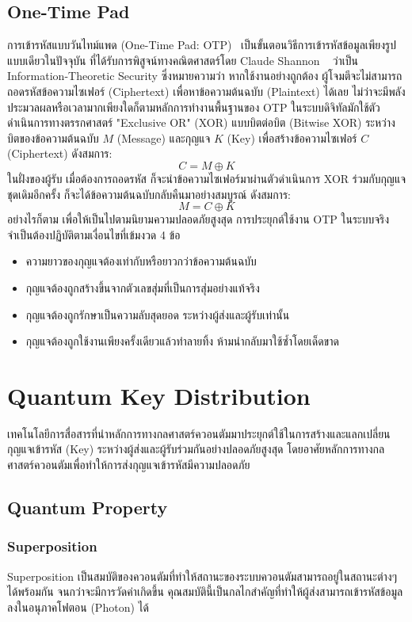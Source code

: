 \subsection{One-Time Pad}
การเข้ารหัสแบบวันไทม์แพด (One-Time Pad: OTP)~\cite{vernam_cipher} เป็นขั้นตอนวิธีการเข้ารหัสข้อมูลเพียงรูปแบบเดียวในปัจจุบัน 
ที่ได้รับการพิสูจน์ทางคณิตศาสตร์โดย Claude Shannon ~\cite{shannon_secure} ว่าเป็น Information-Theoretic Security ซึ่งหมายความว่า หากใช้งานอย่างถูกต้อง 
ผู้โจมตีจะไม่สามารถถอดรหัสข้อความไซเฟอร์ (Ciphertext) เพื่อหาข้อความต้นฉบับ (Plaintext) ได้เลย 
ไม่ว่าจะมีพลังประมวลผลหรือเวลามากเพียงใดก็ตามหลักการทำงานพื้นฐานของ OTP ในระบบดิจิทัลมักใช้ตัวดำเนินการทางตรรกศาสตร์ "Exclusive OR" (XOR) 
แบบบิตต่อบิต (Bitwise XOR) ระหว่างบิตของข้อความต้นฉบับ $M$ (Message) และกุญแจ $K$ (Key) 
เพื่อสร้างข้อความไซเฟอร์ $C$ (Ciphertext) ดังสมการ:
\[C = M \oplus K\]
ในฝั่งของผู้รับ เมื่อต้องการถอดรหัส ก็จะนำข้อความไซเฟอร์มาผ่านตัวดำเนินการ XOR ร่วมกับกุญแจชุดเดิมอีกครั้ง 
ก็จะได้ข้อความต้นฉบับกลับคืนมาอย่างสมบูรณ์ ดังสมการ:\[M = C \oplus K\]อย่างไรก็ตาม 
เพื่อให้เป็นไปตามนิยามความปลอดภัยสูงสุด การประยุกต์ใช้งาน OTP ในระบบจริงจำเป็นต้องปฏิบัติตามเงื่อนไขที่เข้มงวด 4 ข้อ
\begin{itemize}
    \item ความยาวของกุญแจต้องเท่ากับหรือยาวกว่าข้อความต้นฉบับ
    \item กุญแจต้องถูกสร้างขึ้นจากตัวเลขสุ่มที่เป็นการสุ่มอย่างแท้จริง
    \item กุญแจต้องถูกรักษาเป็นความลับสุดยอด ระหว่างผู้ส่งและผู้รับเท่านั้น
    \item กุญแจต้องถูกใช้งานเพียงครั้งเดียวแล้วทำลายทิ้ง ห้ามนำกลับมาใช้ซ้ำโดยเด็ดขาด
\end{itemize}

\section{Quantum Key Distribution}
เทคโนโลยีการสื่อสารที่นำหลักการทางกลศาสตร์ควอนตัมมาประยุกต์ใช้ในการสร้างและแลกเปลี่ยน กุญแจเข้ารหัส (Key) ระหว่างผู้ส่งและผู้รับร่วมกันอย่างปลอดภัยสูงสุด
โดยอาศัยหลักการทางกลศาสตร์ควอนตัมเพื่อทำให้การส่งกุญแจเข้ารหัสมีความปลอดภัย
\subsection{Quantum Property}
\subsubsection{Superposition}
Superposition เป็นสมบัติของควอนตัมที่ทำให้สถานะของระบบควอนตัมสามารถอยู่ในสถานะต่างๆ ได้พร้อมกัน
จนกว่าจะมีการวัดค่าเกิดขึ้น คุณสมบัตินี้เป็นกลไกสำคัญที่ทำให้ผู้ส่งสามารถเข้ารหัสข้อมูลลงในอนุภาคโฟตอน (Photon) ได้
